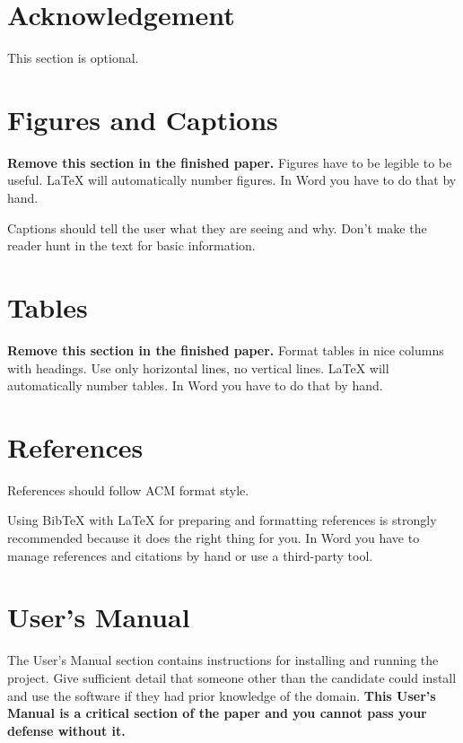 \documentclass[acmlarge,screen]{acmart}
\begin{document}
\section{Acknowledgement}
This section is optional.

\section{Figures and Captions}
\textbf{Remove this section in the finished paper.}
Figures have to be legible to be useful. LaTeX will automatically
number figures. In Word you have to do that by hand.

Captions should tell the user what they are seeing and why. Don't make the reader
hunt in the text for basic information.

\section{Tables}
\textbf{Remove this section in the finished paper.}
Format tables in nice columns with headings. Use only horizontal lines,
no vertical lines. LaTeX will automatically number tables.
In Word you have to do that by hand.

\section{References}
References should follow ACM format style.

Using BibTeX with LaTeX for preparing and formatting references 
is strongly recommended because it does the right thing for you.
In Word you have to manage references and citations by hand or use 
a third-party tool.




\appendix

\section{User's Manual}
The User’s Manual section contains instructions for installing and running the project. Give sufficient detail that someone other than the candidate could install and use the software if they had prior knowledge of the domain.  \textbf{This User's Manual is a critical section of the paper and you cannot pass your defense without it.}
\end{document}
